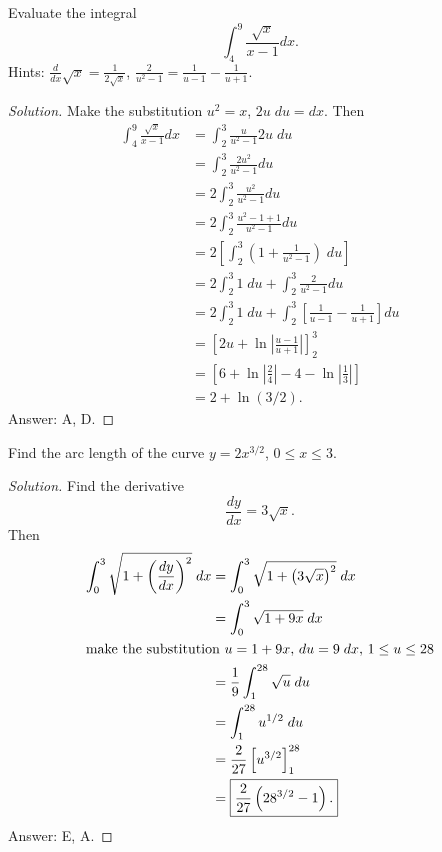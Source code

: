 \begin{problem}
Evaluate the integral
\[
\int_4^9\frac{\sqrt{x}}{x-1}dx.
\]
Hints: $\displaystyle\frac{d}{dx}\sqrt{x}=\frac{1}{2\sqrt{x}}$,
$\displaystyle\frac{2}{u^2-1}=\frac{1}{u-1}-\frac{1}{u+1}$.
\end{problem}
\begin{proof}[Solution]
Make the substitution $u^2=x$, $2u\;du=dx$. Then
\begin{align*}
\int_4^9\frac{\sqrt{x}}{x-1}dx
&=\int_2^3\frac{u}{u^2-1}2u\;du\\
&=\int_2^3\frac{2u^2}{u^2-1}du\\
&=2\int_2^3\frac{u^2}{u^2-1}du\\
&=2\int_2^3\frac{u^2-1+1}{u^2-1}du\\
&=2\left[\int_2^3\left(1+\frac{1}{u^2-1}\right)\;du\right]\\
&=2\int_2^3 1\;du+\int_2^3\frac{2}{u^2-1}du\\
&=2\int_2^3 1\;du+\int_2^3\left[\frac{1}{u-1}-\frac{1}{u+1}\right]du\\
&=\left[2u+\ln\left|\frac{u-1}{u+1}\right|\right]_2^3\\
&=\left[6+\ln\left|\frac{2}{4}\right|-4-\ln\left|\frac{1}{3}\right|\right]\\
&=\boxed{2+\ln(3/2)}.
\end{align*}
Answer: {\color{Red} A}, {\color{Green} D}.
\end{proof}

\begin{problem}
Find the arc length of the curve $y=2x^{3/2}$, $0\leq x\leq 3$.
\end{problem}
\begin{proof}[Solution]
Find the derivative
\[
\frac{dy}{dx}=3\sqrt{x}.
\]
Then
\begin{align*}
\int_0^3\sqrt{1+\left(\frac{dy}{dx}\right)^2}\;dx
&=\int_0^3\sqrt{1+\left(3\sqrt{x}\right)^2}\;dx\\
&=\int_0^3\sqrt{1+9x}\;dx\\
\intertext{make the substitution $u=1+9x$, $du=9\;dx$, $1\leq u\leq 28$}
&=\frac{1}{9}\int_1^{28}\sqrt{u}\;du\\
&=\int_1^{28}u^{1/2}\;du\\
&=\frac{2}{27}\left[u^{3/2}\right]_1^{28}\\
&=\boxed{\frac{2}{27}\left(28^{3/2}-1\right).}
\end{align*}
Answer: {\color{Red} E}, {\color{Green} A}.
\end{proof}

